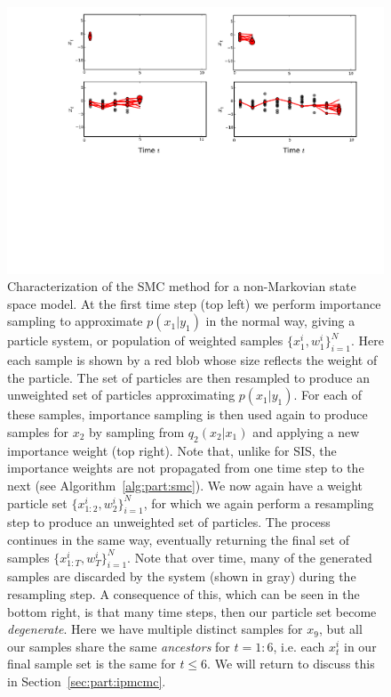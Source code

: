 \begin{figure}[t]
	\centering 
	\includegraphics[width=\textwidth]{part/figures/smc_explan}
	\caption{Characterization of the SMC method for a non-Markovian state space model.  At the first time step (top left) 
		we perform importance sampling to approximate $p(x_1 | y_1)$ in the normal way, giving a particle system, or population
		of weighted samples $\{x_1^i,w_1^i\}_{i=1}^N$.  Here each sample is shown by a red blob whose size reflects the weight
		of the particle.  The set of particles are then resampled to produce an unweighted set of particles approximating
		$p(x_1 | y_1)$.  For each of these samples, importance sampling is then used again to produce samples for $x_2$
		by sampling from $q_2 (x_2 | x_1)$ and applying a new importance weight (top right).  Note that, unlike for SIS,
		the importance weights are not propagated from one time step to the next (see Algorithm~\ref{alg:part:smc}).
		We now again have a weight particle set $\{x_{1:2}^i,w_2^i\}_{i=1}^N$, for which we again perform a resampling
		step to produce an unweighted set of particles.  The process continues in the same way, eventually returning the
		final set of samples $\{x_{1:T}^i,w_T^i\}_{i=1}^N$.  Note that over time, many of the generated samples are
		discarded by the system (shown in gray) during the resampling step.  A consequence of this, which can be seen
		in the bottom right, is that
		many time steps, then our particle set become \emph{degenerate}.  Here we have multiple distinct samples for $x_9$, but
		all our samples share the same \emph{ancestors} for $t=1:6$, i.e. each $x_t^i$ in our final sample set is
		the same for $t\le6$.  We will return to discuss this in Section~\ref{sec:part:ipmcmc}.
		\label{fig:part:smc_explan}}
\end{figure}

